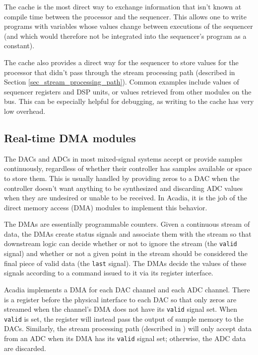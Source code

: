 The cache is the most direct way to exchange information that isn't known at compile time between the processor and the sequencer. This allows one to write programs with variables whose values change between executions of the sequencer (and which would therefore not be integrated into the sequencer's program as a constant). 

The cache also provides a direct way for the sequencer to store values for the processor that didn't pass through the stream processing path (described in Section \ref{sec_stream_processing_path}). Common examples include values of sequencer registers and DSP units, or values retrieved from other modules on the bus. This can be especially helpful for debugging, as writing to the cache has very low overhead.

\subsection{Real-time DMA modules} \label{sec_dma}

The DACs and ADCs in most mixed-signal systems accept or provide samples continuously, regardless of whether their controller has samples available or space to store them. This is usually handled by providing zeros to a DAC when the controller doesn't want anything to be synthesized and discarding ADC values when they are undesired or unable to be received. In Acadia, it is the job of the direct memory access (DMA) modules to implement this behavior.

The DMAs are essentially programmable counters. Given a continuous stream of data, the DMAs create status signals and associate them with the stream so that downstream logic can decide whether or not to ignore the stream (the \lstinline|valid| signal) and whether or not a given point in the stream should be considered the final piece of valid data (the \lstinline|last| signal). The DMAs decide the values of these signals according to a command issued to it via its register interface.

Acadia implements a DMA for each DAC channel and each ADC channel. There is a register before the physical interface to each DAC so that only zeros are streamed when the channel's DMA does not have its \lstinline|valid| signal set. When \lstinline|valid| is set, the register will instead pass the output of sample memory to the DACs. Similarly, the stream processing path (described in \label{sec_stream_processing_path}) will only accept data from an ADC when its DMA has its \lstinline|valid| signal set; otherwise, the ADC data are discarded.

